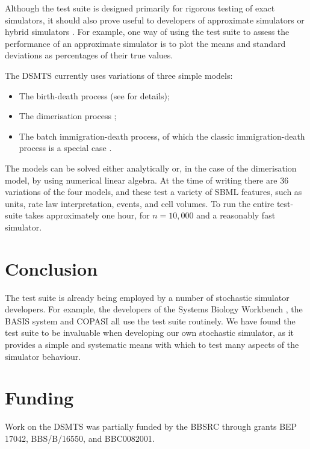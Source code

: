 \documentclass{bioinfo}
\begin{document}
Although the test suite is designed primarily for rigorous testing of exact simulators, it should also prove useful to developers of approximate simulators \citep{Gillespie03} or hybrid simulators \citep{Kiehl04, Puchalka04}. For example, one way of using the test suite to assess the performance of an approximate simulator is to plot the means and standard deviations as percentages of their true values.

The DSMTS currently uses variations of three simple models:
\begin{itemize}
\item The birth-death process (see \cite{Cox65} for details);
\item The dimerisation process \citep{Wilkinson06};
\item The batch immigration-death process, of which the classic immigration-death process is a special case \citep{Gillespie05}.
\end{itemize}
The models can be solved either analytically or, in the case of the
dimerisation model, by using numerical linear algebra. At
the time of writing there are 36 variations of the four models, and these
test a variety of SBML features, such as units, rate law
interpretation, events, and cell volumes. To run the entire test-suite takes approximately one hour, for $n=10,000$ and a reasonably fast simulator.

\section{Conclusion}

The test suite is already being employed by a number of stochastic
simulator developers. For example, the developers of the Systems
Biology Workbench
\citep{Hucka02,Vallabhajosyula07}, the BASIS system
\citep{Kirkwood03, Gillespie06} and COPASI \citep{Hoops06} all
use the test suite routinely. We have found the test suite to
be invaluable when developing our own stochastic simulator, as it provides
a simple and systematic means with which to test many aspects of the
simulator behaviour.

\section*{Funding}

Work on the DSMTS was partially funded by the BBSRC through grants
BEP 17042, BBS/B/16550, and BBC0082001.






\end{document}
